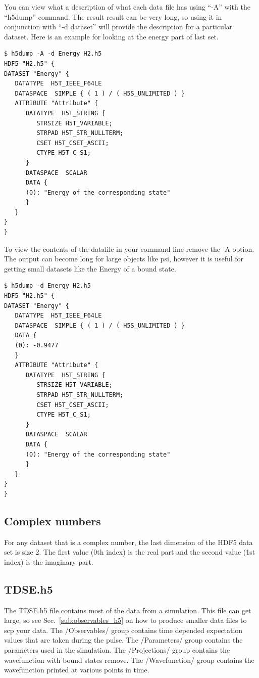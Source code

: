 \documentclass{article}
\begin{document}
You can view what a description of what each data file has using ``-A'' with the ``h5dump'' command. The result result can be very long, so using it in conjunction with ``-d dataset'' will provide the description for a particular dataset. Here is an example for looking at the energy part of last set.
\begin{verbatim}
$ h5dump -A -d Energy H2.h5
HDF5 "H2.h5" {
DATASET "Energy" {
   DATATYPE  H5T_IEEE_F64LE
   DATASPACE  SIMPLE { ( 1 ) / ( H5S_UNLIMITED ) }
   ATTRIBUTE "Attribute" {
      DATATYPE  H5T_STRING {
         STRSIZE H5T_VARIABLE;
         STRPAD H5T_STR_NULLTERM;
         CSET H5T_CSET_ASCII;
         CTYPE H5T_C_S1;
      }
      DATASPACE  SCALAR
      DATA {
      (0): "Energy of the corresponding state"
      }
   }
}
}
\end{verbatim}

To view the contents of the datafile in your command line remove the -A option. The output can become long for large objects like psi, however it is useful for getting small datasets like the Energy of a bound state.
\begin{verbatim}
$ h5dump -d Energy H2.h5
HDF5 "H2.h5" {
DATASET "Energy" {
   DATATYPE  H5T_IEEE_F64LE
   DATASPACE  SIMPLE { ( 1 ) / ( H5S_UNLIMITED ) }
   DATA {
   (0): -0.9477
   }
   ATTRIBUTE "Attribute" {
      DATATYPE  H5T_STRING {
         STRSIZE H5T_VARIABLE;
         STRPAD H5T_STR_NULLTERM;
         CSET H5T_CSET_ASCII;
         CTYPE H5T_C_S1;
      }
      DATASPACE  SCALAR
      DATA {
      (0): "Energy of the corresponding state"
      }
   }
}
}
\end{verbatim}

\subsection{Complex numbers} %
\label{sub:complex_numbers}
For any dataset that is a complex number, the last dimension of the HDF5 data set is size 2. The first value (0th index) is the real part and the second value (1st index) is the imaginary part.

\subsection{TDSE.h5} %
\label{sub:tdse_h5}
The TDSE.h5 file contains most of the data from a simulation. This file can get large, so see Sec.~\ref{sub:observables_h5} on how to produce smaller data files to scp your data. The /Observables/ group contains time depended expectation values that are taken during the pulse. The /Parameters/ group contains the parameters used in the simulation. The /Projections/ group contains the wavefunction with bound states remove. The /Wavefunction/ group contains the wavefunction printed at various points in time.
\end{document}
